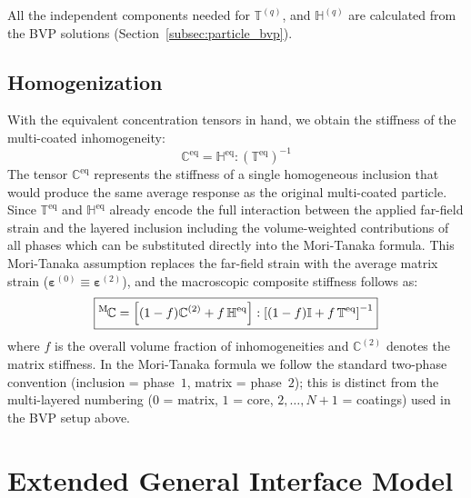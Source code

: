\documentclass[oneside, 12pt, a4paper, bibliography=totoc]{book}
\newcommand{\bs}[1]{\bm{#1}}                       %
\begin{document}
All the independent components needed for $\mathbb{T}^{(q)}$, and $\mathbb{H}^{(q)}$ are calculated from the BVP solutions (Section~\ref{subsec:particle_bvp}).

\subsection{Homogenization}
\label{subsec:interphase_homogenization}

With the equivalent concentration tensors in hand, we obtain the stiffness of the multi-coated inhomogeneity:
%
\begin{equation}
    \mathbb{C}^{\text{eq}} = \mathbb{H}^{\text{eq}} : \left(\mathbb{T}^{\text{eq}}\right)^{-1}
    \label{eq:equivalent_stiffness}
\end{equation}
%
The tensor $\mathbb{C}^{\text{eq}}$ represents the stiffness of a single homogeneous inclusion that would produce the same average response as the original multi-coated particle. Since $\mathbb{T}^{\text{eq}}$ and $\mathbb{H}^{\text{eq}}$ already encode the full interaction between the applied far-field strain and the layered inclusion including the volume-weighted contributions of all phases which can be substituted directly into the Mori-Tanaka formula. This Mori-Tanaka assumption replaces the far-field strain with the average matrix strain ($\bs{\varepsilon}^{(0)} \equiv \bs{\varepsilon}^{(2)}$), and the macroscopic composite stiffness follows as:
%
\begin{equation}
    \boxed{{}^{\mathrm{M}}\hspace{-1pt}\mathbb{C} = \left[(1-f)\mathbb{C}^{(2)} + f\,\mathbb{H}^{\text{eq}}\right] : \left[(1-f)\mathbb{I} + f\,\mathbb{T}^{\text{eq}}\right]^{-1}}
    \label{eq:MT_interphase}
\end{equation}
%
where $f$ is the overall volume fraction of inhomogeneities and $\mathbb{C}^{(2)}$ denotes the matrix stiffness. In the Mori-Tanaka formula we follow the standard two-phase convention (inclusion = phase~$1$, matrix = phase~$2$); this is distinct from the multi-layered numbering ($0$ = matrix, $1$ = core, $2, \ldots, N{+}1$ = coatings) used in the BVP setup above. 
\section{Extended General Interface Model}
\label{sec:interface_model}
\label{sec:interface_models}
\end{document}
